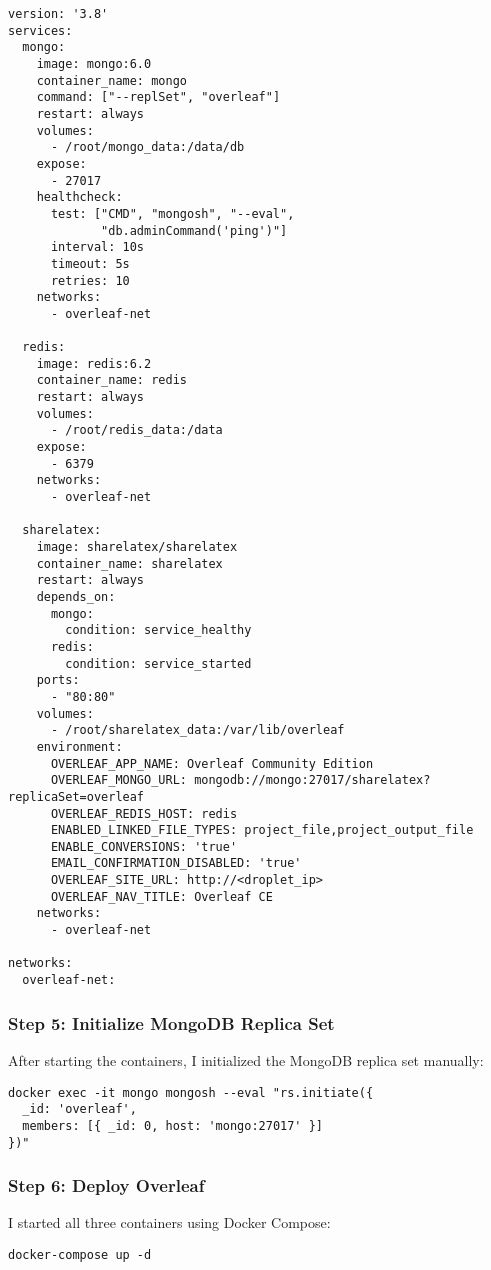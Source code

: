 \begin{verbatim}
version: '3.8'
services:
  mongo:
    image: mongo:6.0
    container_name: mongo
    command: ["--replSet", "overleaf"]
    restart: always
    volumes:
      - /root/mongo_data:/data/db
    expose:
      - 27017
    healthcheck:
      test: ["CMD", "mongosh", "--eval", 
             "db.adminCommand('ping')"]
      interval: 10s
      timeout: 5s
      retries: 10
    networks:
      - overleaf-net
      
  redis:
    image: redis:6.2
    container_name: redis
    restart: always
    volumes:
      - /root/redis_data:/data
    expose:
      - 6379
    networks:
      - overleaf-net
      
  sharelatex:
    image: sharelatex/sharelatex
    container_name: sharelatex
    restart: always
    depends_on:
      mongo:
        condition: service_healthy
      redis:
        condition: service_started
    ports:
      - "80:80"
    volumes:
      - /root/sharelatex_data:/var/lib/overleaf
    environment:
      OVERLEAF_APP_NAME: Overleaf Community Edition
      OVERLEAF_MONGO_URL: mongodb://mongo:27017/sharelatex?replicaSet=overleaf
      OVERLEAF_REDIS_HOST: redis
      ENABLED_LINKED_FILE_TYPES: project_file,project_output_file
      ENABLE_CONVERSIONS: 'true'
      EMAIL_CONFIRMATION_DISABLED: 'true'
      OVERLEAF_SITE_URL: http://<droplet_ip>
      OVERLEAF_NAV_TITLE: Overleaf CE
    networks:
      - overleaf-net
      
networks:
  overleaf-net:
\end{verbatim}

\subsubsection{Step 5: Initialize MongoDB Replica Set}
After starting the containers, I initialized the MongoDB replica set manually:
\begin{verbatim}
docker exec -it mongo mongosh --eval "rs.initiate({
  _id: 'overleaf',
  members: [{ _id: 0, host: 'mongo:27017' }]
})"
\end{verbatim}

\subsubsection{Step 6: Deploy Overleaf}
I started all three containers using Docker Compose:
\begin{verbatim}
docker-compose up -d
\end{verbatim}

